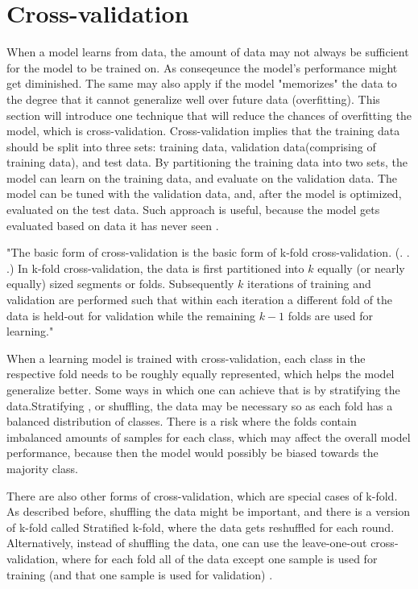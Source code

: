 \section{Cross-validation}\label{sec:cross-validation}
When a model learns from data, the amount of data may not always be sufficient for the model to be trained on. As conseqeunce the model's performance might get diminished. The same may also apply if the model "memorizes" the data to the degree that it cannot generalize well over future data (overfitting). This section will introduce one technique that will reduce the chances of overfitting the model, which is cross-validation. Cross-validation implies that the training data should be split into three sets: training data, validation data(comprising of training data), and test data. By partitioning the training data into two sets, the model can learn on the training data, and evaluate on the validation data. The model can be tuned with the validation data, and, after the model is optimized, evaluated on the test data. Such approach is useful, because the model gets evaluated based on data it has never seen \cite{scikit-learn}.



"The basic form of cross-validation is the basic form of k-fold cross-validation. (. . .) In k-fold cross-validation, the data is first partitioned into $k$ equally (or nearly equally) sized segments or folds. Subsequently $k$ iterations of training and validation are performed such that within each iteration a different fold of the data is held-out for validation while the remaining $k-1$ folds are used for learning." \cite{Refaeilzadeh2009}


When a learning model is trained with cross-validation, each class in the respective fold needs to be roughly equally represented, which helps the model generalize better. Some ways in which one can achieve that is by stratifying the data.Stratifying \cite{Refaeilzadeh2009}, or shuffling, the data may be necessary so as each fold has a balanced distribution of classes. There is a risk where the folds contain imbalanced amounts of samples for each class, which may affect the overall model performance, because then the model would possibly be biased towards the majority class.

There are also other forms of cross-validation, which are special cases of k-fold. As described before, shuffling the data might be important, and there is a version of k-fold called Stratified k-fold, where the data gets reshuffled for each round. Alternatively, instead of shuffling the data, one can use the leave-one-out cross-validation, where for each fold all of the data except one sample is used for training (and that one sample is used for validation) \cite{Refaeilzadeh2009}.

